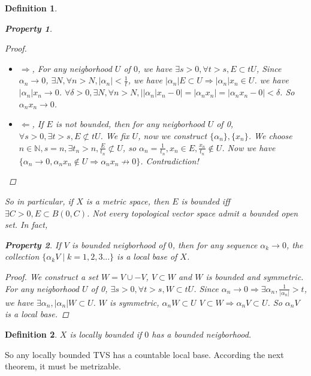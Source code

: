 \documentclass{article}
\newtheorem*{property}{Property}
\newtheorem*{definition}{Definition}
\begin{document}
\begin{definition}
\begin{property}
\begin{proof}
      \begin{itemize}
        \item $\Rightarrow$, For any neigborhood $U$ of $0$,  
        we have $\exists s > 0, \forall t > s, E \subset tU$,
        Since $\alpha_n \rightarrow 0$, $\exists N, \forall n > N, |\alpha_n| < \frac{1}{t}$,
        we have $|\alpha_n|E \subset U \Rightarrow |\alpha_n|x_n \in U$. we have $|\alpha_n|x_n \rightarrow 0$.
        $\forall \delta > 0, \exists N, \forall n > N, ||\alpha_n|x_n - 0| = |\alpha_n x_n| = |\alpha_n x_n - 0| < \delta$.
        So $\alpha_n x_n \rightarrow 0$.
        \item $\Leftarrow$,
        If $E$ is not bounded, then for any neigborhood $U$ of 0,
        $\forall s > 0, \exists t > s, E \not \subset tU$.
        We fix $U$,
        now we construct $\{\alpha_n\}, \{x_n\}$.
        We choose $n \in \mathbb{N}, s = n, \exists t_n > n, \frac{E}{t_n} \not \subset U$,
        so $\alpha_n = \frac{1}{t_n}, x_n \in E, \frac{x_n}{t_n} \not \in U$.
        Now we have $\{\alpha_n \rightarrow 0, \alpha_n x_n \not \in U \Rightarrow \alpha_n x_n \not \rightarrow 0\}$.
        Contradiction!
      \end{itemize}
    \end{proof}
  \end{property}
  So in particular, if $X$ is a metric space, then $E$ is bounded iff $\exists C > 0, E \subset B(0, C)$.
  Not every topological vector space admit a bounded open set. In fact,
  \begin{property}
    If $V$ is bounded neigborhood of $0$, then for any sequence $\alpha_k \rightarrow 0$, the collection
    $\{\alpha_k V \mid k = 1, 2, 3...\}$ is a local base of $X$.
    \begin{proof}
      We construct a set $W = V \cup -V$, $V \subset W$ and $W$ is bounded and symmetric.
      For any neigborhood $U$ of 0, $\exists s > 0, \forall t > s, W \subset tU$.
      Since $\alpha_n \rightarrow 0 \Rightarrow \exists \alpha_n, \frac{1}{|\alpha_n|} > t$,
      we have $\exists \alpha_n, |\alpha_n| W \subset U$. 
      $W$ is symmetric, $\alpha_n W \subset U$ $V \subset W \Rightarrow \alpha_n V \subset U$.
      So ${\alpha_n V}$ is a local base.
    \end{proof}
  \end{property}
\end{definition}
\begin{definition}
  $X$ is locally bounded if $0$ has a bounded neigborhood.
\end{definition}
So any locally bounded TVS has a countable local base. According the next theorem, it must be metrizable.
\end{document}
